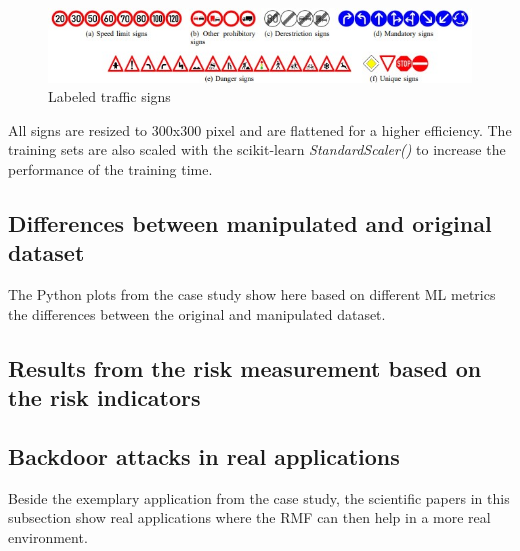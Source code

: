 \begin{figure}[h!]
  \centering
  \includegraphics[width=12cm]{pictures/traffic_signs.jpg}
  \caption{Labeled traffic signs \cite{DBLP:conf/ijcnn/StallkampSSI11}}
  \label{fig:traffic_signs}
\end{figure}

All signs are resized to 300x300 pixel and are flattened for a higher efficiency. The training sets are also scaled with the scikit-learn \textit{StandardScaler()} to increase the performance of the training time.

\subsection{Differences between manipulated and original dataset}

The Python plots from the case study show here based on different ML metrics the differences between the original and manipulated dataset.

\subsection{Results from the risk measurement based on the risk indicators}

\subsection{Backdoor attacks in real applications}

Beside the exemplary application from the case study, the scientific papers in this subsection show real applications where the RMF can then help in a more real environment.
